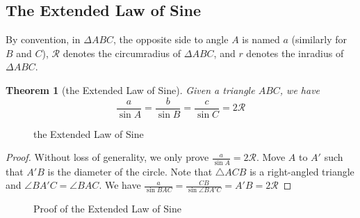\documentclass{article}
\newtheorem{theorem}{Theorem}[section]
\theoremstyle{definition}
\begin{document}
\subsection{The Extended Law of Sine}
By convention, in $\Delta ABC$, the opposite side to angle $A$ is named $a$ (similarly for $B$ and $C$), $\mathcal{R}$ denotes the circumradius of $\Delta ABC$, and $r$ denotes the inradius of $\Delta ABC$.
\begin{mdframed}
	\begin{theorem}[the Extended Law of Sine]
		Given a triangle $ABC$, we have 
		\begin{equation*}
			\frac{a}{\sin A} = \frac{b}{\sin B} = \frac{c}{\sin C} = 2\mathcal{R}
		\end{equation*}
	\end{theorem}
	\begin{center}
		\begin{figure}[H]
			\centering
			\caption{the Extended Law of Sine}
		\end{figure}
	\end{center}
\end{mdframed}
\begin{proof}
	Without loss of generality, we only prove $\frac{a}{\sin A} = 2\mathcal{R}$. Move $A$ to $A'$ such that $A'B$ is the diameter of the circle. Note that $\triangle ACB$ is a right-angled triangle and $\angle BA'C = \angle BAC$. We have $\frac{a}{\sin BAC} = \frac{CB}{\sin \angle BA'C} = A'B = 2\mathcal{R}$
\end{proof}
\begin{figure}[H]
	\centering
	\caption{Proof of the Extended Law of Sine}
\end{figure}
\end{document}
